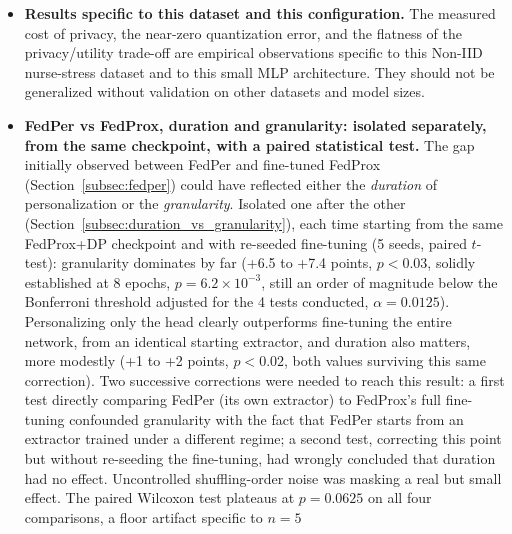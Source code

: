 \documentclass{article}
\begin{document}
\begin{itemize}
  supported among those listed here, emerges from the new-joiner scenario
  (Section~\ref{subsec:late_joiner_recall}): the optimal decision threshold after
  local adaptation diverges in opposite directions depending on the client
  ($0.001$ versus $0.950$ on the two tested cases), suggesting that a
  \emph{per-client} threshold calibration, performed on a dedicated validation
  split distinct from the test set, could bring a clinical recall gain without
  modifying the model itself, a lead that would be inexpensive to validate in a
  future iteration.
  \item \textbf{Results specific to this dataset and this configuration.} The
  measured cost of privacy, the near-zero quantization error, and the flatness
  of the privacy/utility trade-off are empirical observations specific to this
  Non-IID nurse-stress dataset and to this small MLP architecture. They should
  not be generalized without validation on other datasets and model sizes.
  \item \textbf{FedPer vs FedProx, duration and granularity: isolated
  separately, from the same checkpoint, with a paired statistical test.} The gap
  initially observed between FedPer and fine-tuned FedProx
  (Section~\ref{subsec:fedper}) could have reflected either the \emph{duration}
  of personalization or the \emph{granularity}. Isolated one after the other
  (Section~\ref{subsec:duration_vs_granularity}), each time starting from the
  same FedProx+DP checkpoint and with re-seeded fine-tuning (5 seeds, paired
  $t$-test): granularity dominates by far (+6.5 to +7.4 points, $p<0.03$,
  solidly established at 8 epochs, $p=6.2\times10^{-3}$, still an order of
  magnitude below the Bonferroni threshold adjusted for the 4 tests conducted,
  $\alpha=0.0125$). Personalizing only the head clearly outperforms fine-tuning
  the entire network, from an identical starting extractor, and duration also
  matters, more modestly (+1 to +2 points, $p<0.02$, both values surviving this
  same correction). Two successive corrections were needed to reach this
  result: a first test directly comparing FedPer (its own extractor) to
  FedProx's full fine-tuning confounded granularity with the fact that FedPer
  starts from an extractor trained under a different regime; a second test,
  correcting this point but without re-seeding the fine-tuning, had wrongly
  concluded that duration had no effect. Uncontrolled shuffling-order noise was
  masking a real but small effect. The paired Wilcoxon test plateaus at
  $p=0.0625$ on all four comparisons, a floor artifact specific to $n=5$

\end{itemize}
\end{document}
